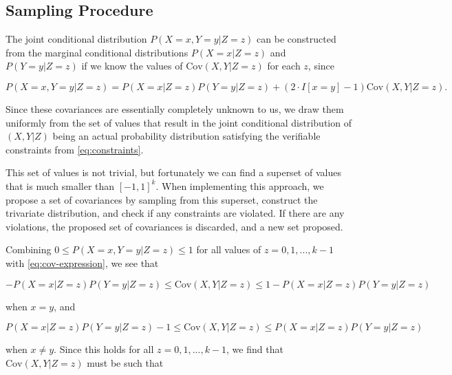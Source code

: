 \documentclass[
]{article}
\theoremstyle{plain}
\begin{document}
\hypertarget{sampling-procedure}{%
\subsection{Sampling Procedure}\label{sampling-procedure}}

The joint conditional distribution \(P(X = x, Y = y | Z = z)\) can be constructed from the marginal conditional distributions \(P(X = x | Z = z)\) and \(P(Y = y | Z = z)\) if we know the values of \(\text{Cov}(X, Y | Z = z)\) for each \(z\), since

\begin{equation}
P(X = x, Y = y | Z = z) = P(X = x | Z = z)P(Y = y | Z = z) + (2\cdot I[x = y] - 1)\text{Cov}(X, Y | Z = z). \label{eq:cov-expression}
\end{equation}

Since these covariances are essentially completely unknown to us, we draw them uniformly from the set of values that result in the joint conditional distribution of \((X,Y|Z)\) being an actual probability distribution satisfying the verifiable constraints from \eqref{eq:constraints}.

This set of values is not trivial, but fortunately we can find a superset of values that is much smaller than \([-1,1]^k\). When implementing this approach, we propose a set of covariances by sampling from this superset, construct the trivariate distribution, and check if any constraints are violated. If there are any violations, the proposed set of covariances is discarded, and a new set proposed.

Combining \(0 \le P(X = x, Y = y | Z = z) \le 1\) for all values of \(z = 0, 1, ..., k-1\) with \eqref{eq:cov-expression}, we see that

\begin{equation*}
-P(X = x | Z = z) P(Y = y | Z = z) \le \text{Cov}(X, Y | Z = z) \le 1 - P(X = x | Z = z)P(Y = y | Z = z)
\end{equation*}

when \(x = y\), and

\begin{equation*}
P(X = x | Z = z) P(Y = y | Z = z) - 1 \le \text{Cov}(X, Y | Z = z) \le P(X = x | Z = z)P(Y = y | Z = z)
\end{equation*}

when \(x \neq y\). Since this holds for all \(z = 0,1,...,k-1\), we find that \(\text{Cov}(X, Y | Z = z)\) must be such that
\end{document}
